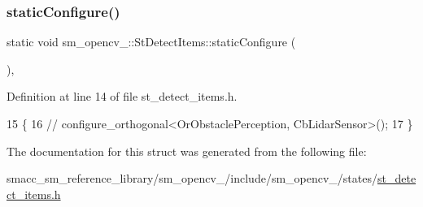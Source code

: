 \subsubsection{\texorpdfstring{static\+Configure()}{staticConfigure()}}
{\footnotesize\ttfamily static void sm\+\_\+opencv\+\_\+::\+St\+Detect\+Items\+::static\+Configure (\begin{DoxyParamCaption}{ }\end{DoxyParamCaption})\hspace{0.3cm}{\ttfamily [inline]}, {\ttfamily [static]}}



Definition at line 14 of file st\+\_\+detect\+\_\+items.\+h.


\begin{DoxyCode}
15   \{
16     \textcolor{comment}{//   configure\_orthogonal<OrObstaclePerception, CbLidarSensor>();}
17   \}
\end{DoxyCode}


The documentation for this struct was generated from the following file\+:\begin{DoxyCompactItemize}
\item 
smacc\+\_\+sm\+\_\+reference\+\_\+library/sm\+\_\+opencv\+\_/include/sm\+\_\+opencv\+\_/states/\hyperlink{3_2include_2sm__opencv__3_2states_2st__detect__items_8h}{st\+\_\+detect\+\_\+items.\+h}\end{DoxyCompactItemize}
